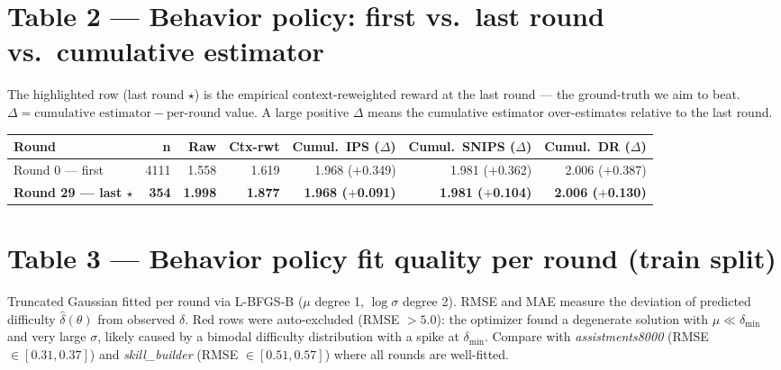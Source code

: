 \documentclass[11pt]{article}
\begin{document}
\section*{Table 2 — Behavior policy: first vs.\ last round vs.\ cumulative estimator}

{\small The highlighted row (last round $\star$) is the empirical context-reweighted reward at the
last round --- the ground-truth we aim to beat.
$\Delta = \text{cumulative estimator} - \text{per-round value}$.
A large positive $\Delta$ means the cumulative estimator over-estimates relative to the last round.}

\bigskip
\begin{tabular}{lrrrrrr}
\toprule
\textbf{Round} & \textbf{n} & \textbf{Raw} & \textbf{Ctx-rwt} & \textbf{Cumul.\ IPS ($\Delta$)} & \textbf{Cumul.\ SNIPS ($\Delta$)} & \textbf{Cumul.\ DR ($\Delta$)} \\
\midrule
Round 0 --- first & 4111 & 1.558 & 1.619 & 1.968 ($+$0.349) & 1.981 ($+$0.362) & 2.006 ($+$0.387) \\
\rowcolor{groundbg}
\textbf{Round 29 --- last $\star$} & \textbf{354} & \textbf{1.998} & \textbf{1.877} & \textbf{1.968 ($+$0.091)} & \textbf{1.981 ($+$0.104)} & \textbf{2.006 ($+$0.130)} \\
\bottomrule
\end{tabular}

\section*{Table 3 — Behavior policy fit quality per round (train split)}

{\small Truncated Gaussian fitted per round via L-BFGS-B ($\mu$ degree 1, $\log\sigma$ degree 2).
RMSE and MAE measure the deviation of predicted difficulty $\hat\delta(\theta)$ from observed $\delta$.
\colorbox{red!20}{Red rows} were auto-excluded (RMSE $> 5.0$): the optimizer found a degenerate
solution with $\mu \ll \delta_{\min}$ and very large $\sigma$, likely caused by a bimodal
difficulty distribution with a spike at $\delta_{\min}$.
Compare with \textit{assistments8000} (RMSE $\in [0.31, 0.37]$) and
\textit{skill\_builder} (RMSE $\in [0.51, 0.57]$) where all rounds are well-fitted.}
\end{document}

